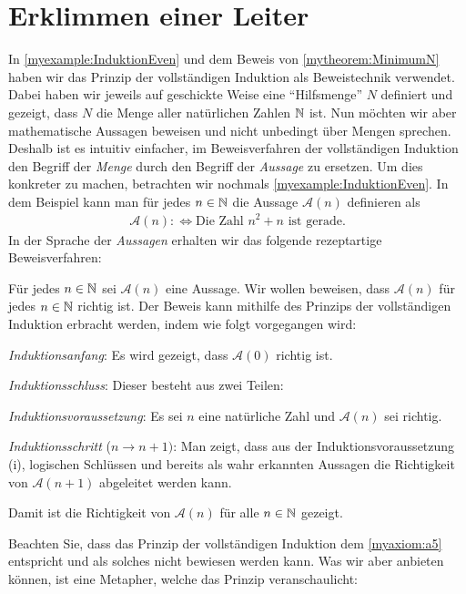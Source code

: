 \section{Erklimmen einer Leiter}
In \cref{myexample:InduktionEven} und dem Beweis von \cref{mytheorem:MinimumN} haben wir das Prinzip der vollständigen Induktion als Beweistechnik verwendet. Dabei haben wir jeweils auf geschickte Weise eine \enquote{Hilfsmenge} $N$ definiert und gezeigt, dass $N$ die Menge aller natürlichen Zahlen $\mathbb{N}$ ist. Nun möchten wir aber mathematische Aussagen beweisen und nicht unbedingt über Mengen sprechen. Deshalb ist es intuitiv einfacher, im Beweisverfahren der vollständigen Induktion den Begriff der \textit{Menge} durch den Begriff der \textit{Aussage} zu ersetzen. Um dies konkreter zu machen, betrachten wir nochmals \cref{myexample:InduktionEven}. In dem Beispiel kann man für jedes $n\in\mathbb{N}$ die Aussage $\mathcal{A}(n)$ definieren als
\begin{align*}
	\mathcal{A}(n) :\iff \text{Die Zahl $n^2 + n$ ist gerade}.
\end{align*}
In der Sprache der \textit{Aussagen} erhalten wir das folgende rezeptartige Beweisverfahren:
\begin{mysummary}\label{mysummary:Induktion}

	Für jedes $n\in\mathbb{N}$ sei $\mathcal{A}(n)$ eine Aussage. Wir wollen beweisen, dass $\mathcal{A}(n)$ für jedes $n\in\mathbb{N}$ richtig ist. Der Beweis kann mithilfe des Prinzips der vollständigen Induktion erbracht werden, indem wie folgt vorgegangen wird:
	\begin{aenum}
		\item \textit{Induktionsanfang}: Es wird gezeigt, dass $\mathcal{A}(0)$ richtig ist.
		\item \textit{Induktionsschluss}: Dieser besteht aus zwei Teilen:
		\begin{renum}
			\item \textit{Induktionsvoraussetzung}: Es sei $n$ eine natürliche Zahl und $\mathcal{A}(n)$ sei richtig.
			\item \textit{Induktionsschritt} ($n\to n+1)$: Man zeigt, dass aus der Induktionsvoraussetzung (i), logischen Schlüssen und bereits als wahr erkannten Aussagen die Richtigkeit von $\mathcal{A}(n+1)$ abgeleitet werden kann.
		\end{renum}
	\end{aenum}
	Damit ist die Richtigkeit von $\mathcal{A}(n)$ für alle $n\in\mathbb{N}$ gezeigt.
\end{mysummary}
Beachten Sie, dass das Prinzip der vollständigen Induktion dem \cref{myaxiom:a5} entspricht und als solches nicht bewiesen werden kann. Was wir aber anbieten können, ist eine Metapher, welche das Prinzip veranschaulicht:

